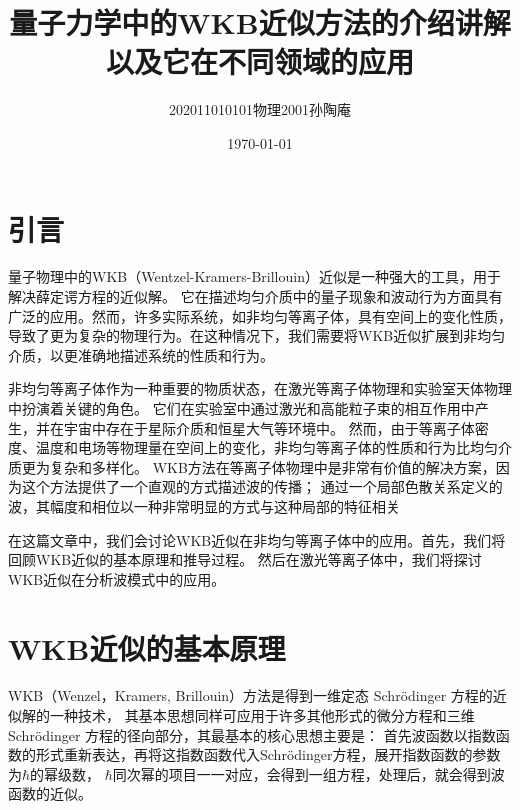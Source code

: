 \documentclass[12pt, a4paper, oneside]{ctexart}
\title{量子力学中的WKB近似方法的介绍讲解以及它在不同领域的应用}
\date{\today}
\author{202011010101物理2001孙陶庵}
\begin{document}
\begin{spacing}{2.0}
\tableofcontents
\maketitle

\section{引言}
量子物理中的WKB（Wentzel-Kramers-Brillouin）近似是一种强大的工具，用于解决薛定谔方程的近似解。
它在描述均匀介质中的量子现象和波动行为方面具有广泛的应用。然而，许多实际系统，如非均匀等离子体，具有空间上的变化性质，
导致了更为复杂的物理行为。在这种情况下，我们需要将WKB近似扩展到非均匀介质，以更准确地描述系统的性质和行为。

非均匀等离子体作为一种重要的物质状态，在激光等离子体物理和实验室天体物理中扮演着关键的角色。
它们在实验室中通过激光和高能粒子束的相互作用中产生，并在宇宙中存在于星际介质和恒星大气等环境中。
然而，由于等离子体密度、温度和电场等物理量在空间上的变化，非均匀等离子体的性质和行为比均匀介质更为复杂和多样化。
WKB方法在等离子体物理中是非常有价值的解决方案，因为这个方法提供了一个直观的方式描述波的传播；
通过一个局部色散关系定义的波，其幅度和相位以一种非常明显的方式与这种局部的特征相关

在这篇文章中，我们会讨论WKB近似在非均匀等离子体中的应用。首先，我们将回顾WKB近似的基本原理和推导过程。
然后在激光等离子体中，我们将探讨WKB近似在分析波模式中的应用。

\section{WKB近似的基本原理}
WKB（Wenzel，Kramers, Brillouin）方法是得到一维定态 Schrödinger 方程的近似解的一种技术，
其基本思想同样可应用于许多其他形式的微分方程和三维 Schrödinger 方程的径向部分，其最基本的核心思想主要是：
首先波函数以指数函数的形式重新表达，再将这指数函数代入Schrödinger方程，展开指数函数的参数为$\hbar$的幂级数，
$\hbar$同次幂的项目一一对应，会得到一组方程，处理后，就会得到波函数的近似。

\end{spacing}
\end{document}
